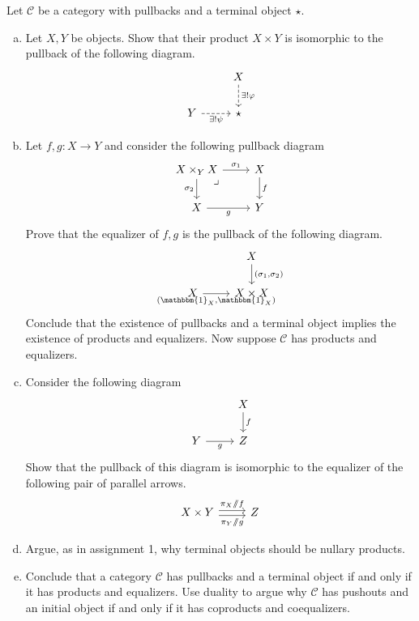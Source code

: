 \documentclass{amsart}
\theoremstyle{remark}
\theoremstyle{definition}
\theoremstyle{definition}
\newcommand{\Id}[1]{\mathbbm{1}_{#1}}
\def\then{\sslash}
\def\mcC{\mathcal{C}}
\begin{document}
Let $\mcC$ be a category with pullbacks and a terminal object $\star$. 
\begin{enumerate}[(a)]
    \item Let $X,Y$ be objects. Show that their product $X\times Y$ is isomorphic to the pullback of the following diagram.
    \[
    \begin{tikzcd}
     {} & X \arrow[d, dashed,"\exists!\varphi"]\\
     Y \arrow[r, dashed,"\exists!\psi"'] & \star 
    \end{tikzcd}
    \]
    
    \item Let $f,g:X\to Y$ and consider the following pullback diagram
    \[
    \begin{tikzcd}
     X\times_Y X \arrow[r,"\sigma_1"]\arrow[d,"\sigma_2"'] \arrow[dr, phantom, "\lrcorner", very near start]  & X \arrow[d,"f"] \\
     X \arrow[r,"g"'] & Y
    \end{tikzcd}
    \]
    Prove that the equalizer of $f,g$ is the pullback of the following diagram.
    \[
    \begin{tikzcd}
      {} & X \arrow[d,"{(\sigma_1,\sigma_2)}"] \\
      X \arrow[r,"{(\Id{X},\Id{X})}"'] & X\times X
    \end{tikzcd}
    \]
    Conclude that the existence of pullbacks and a terminal object implies the existence of products and equalizers. Now suppose $\mathcal{C}$ has products and equalizers.
    
    \item Consider the following diagram
    \[
    \begin{tikzcd}
     {} & X \arrow[d,"f"] \\
     Y \arrow[r,"g"'] & Z
    \end{tikzcd}
    \]
    Show that the pullback of this diagram is isomorphic to the equalizer of the following pair of parallel arrows.
    \[
    \begin{tikzcd}
    X\times Y\arrow[r,shift left = .5 ex,"\pi_X\then f"] \arrow[r, shift right = .5 ex, "\pi_Y\then g"'] & Z
    \end{tikzcd}
    \]
    \item Argue, as in assignment 1, why terminal objects should be nullary products.
    
    \item Conclude that a category $\mcC$ has pullbacks and a terminal object if and only if it has products and equalizers. Use duality to argue why $\mcC$ has pushouts and an initial object if and only if it has coproducts and coequalizers.
\end{enumerate}
\end{document}
